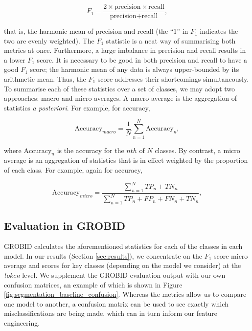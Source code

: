 \begin{equation}
F_1 = \frac{2 \times \text{precision} \times \text{recall}}{\text{precision} + \text{recall}},
\label{eq:f1}
\end{equation}

that is, the harmonic mean of precision and recall (the ``1'' in $F_1$ indicates the two are evenly weighted). The $F_1$ statistic is a neat way of summarising both metrics at once. Furthermore, a large imbalance in precision and recall results in a lower $F_1$ score. It is necessary to be good in both precision and recall to have a good $F_1$ score; the harmonic mean of any data is always upper-bounded by its arithmetic mean. Thus, the $F_1$ score addresses their shortcomings simultaneously. To summarise each of these statistics over a set of classes, we may adopt two approaches: macro and micro averages. A macro average is the aggregation of statistics \emph{a posteriori}. For example, for accuracy,

\begin{equation}
\text{Accuracy}_{macro} = \frac{1}{N}\sum_{n=1}^{N}\text{Accuracy}_n,
\label{eq:macroaccuracy}
\end{equation}

where $\text{Accuracy}_n$ is the accuracy for the $nth$ of $N$ classes. By contrast, a micro average is an aggregation of statistics that is in effect weighted by the proportion of each class. For example, again for accuracy,

\begin{equation}
\text{Accuracy}_{micro} = \frac{\sum_{n=1}^N TP_n + TN_n}{\sum_{n=1}^N TP_n + FP_n + FN_n + TN_n},
\label{eq:microaccuracy}
\end{equation}

\subsection{Evaluation in GROBID}

GROBID calculates the aforementioned statistics for each of the classes in each model. In our results (Section \ref{sec:results}), we concentrate on the $F_1$ score micro average and scores for key classes (depending on the model we consider) at the \emph{token} level. We supplement the GROBID evaluation output with our own confusion matrices, an example of which is shown in Figure \ref{fig:segmentation_baseline_confusion}. Whereas the metrics allow us to compare one model to another, a confusion matrix can be used to see exactly which misclassifications are being made, which can in turn inform our feature engineering.


